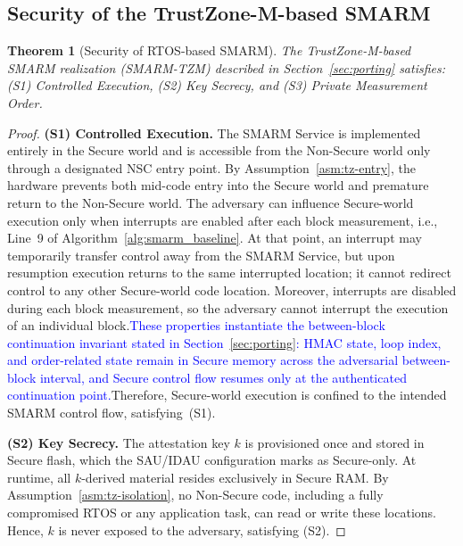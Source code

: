 \documentclass[journal]{IEEEtran}
\newcommand\ben[1]{\textcolor{blue}{#1}}
\newcommand{\smarm}{SMARM\xspace}
\newtheorem{theorem}{Theorem}[section]
\begin{document}
\subsection{Security of the TrustZone-M-based \smarm}
\label{sec:tzm-security}

\begin{theorem}[Security of RTOS-based SMARM]
\label{thm:tzm}
The TrustZone-M-based SMARM realization (SMARM-TZM) described in Section~\ref{sec:porting} satisfies: (S1) Controlled Execution,
(S2) Key Secrecy, and (S3) Private Measurement Order.
\end{theorem}

 
\begin{proof}


\textbf{(S1) Controlled Execution.}
The SMARM Service is implemented entirely in the Secure world and is accessible from the Non-Secure world only through a designated NSC entry point.
By Assumption~\ref{asm:tz-entry}, the hardware prevents both mid-code entry into the Secure world and premature return to the Non-Secure world.
The adversary can influence Secure-world execution only when interrupts are enabled after each block measurement, i.e., Line~9 of Algorithm~\ref{alg:smarm_baseline}.
At that point, an interrupt may temporarily transfer control away from the SMARM Service, but upon resumption execution returns to the same interrupted location; it cannot redirect control to any other Secure-world code location.
Moreover, interrupts are disabled during each block measurement, so the adversary cannot interrupt the execution of an individual block.\ben{These properties instantiate the between-block continuation invariant stated in Section~\ref{sec:porting}: HMAC state, loop index, and order-related state remain in Secure memory across the adversarial between-block interval, and Secure control flow resumes only at the authenticated continuation point.}Therefore, Secure-world execution is confined to the intended SMARM control flow, satisfying~(S1).
 
\medskip
\noindent\textbf{(S2) Key Secrecy.}
The attestation key $k$ is provisioned once and stored in Secure flash,
which the SAU/IDAU configuration marks as Secure-only.
At runtime, all $k$-derived material resides exclusively in Secure RAM.
By Assumption~\ref{asm:tz-isolation}, no Non-Secure code, including a
fully compromised RTOS or any application task, can read or write these locations.
Hence, $k$ is never exposed to the adversary, satisfying (S2).
 

\end{proof}
\end{document}
